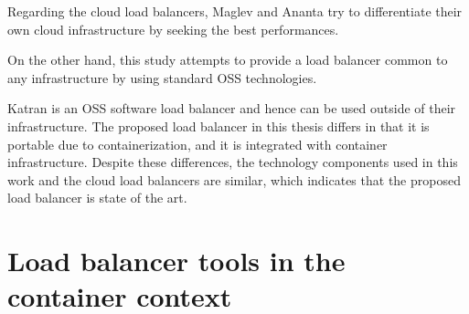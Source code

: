 \begin{table}[h]
  \centering

  \par\bigskip
  \begin{minipage}{1.0\columnwidth}
    \caption[Cloud load balancer comparison]{
    Cloud load balancer comparison.
    }   
    \label{tabl:cloud_lb}
  \end{minipage}

  \par\bigskip
  \begin{minipage}{0.9\columnwidth}
    \label{tabl:cloud_lb}
  \end{minipage}
\end{table}



Regarding the cloud load balancers, Maglev and Ananta try to differentiate their own cloud infrastructure by seeking the best performances.

On the other hand, this study attempts to provide a load balancer common to any infrastructure by using standard OSS technologies.


Katran is an OSS software load balancer and hence can be used outside of their infrastructure.
The proposed load balancer in this thesis differs in that it is portable due to containerization, and it is integrated with container infrastructure.
Despite these differences, the technology components used in this work and the cloud load balancers are similar, which indicates that the proposed load balancer is state of the art.


\section{Load balancer tools in the container context}


